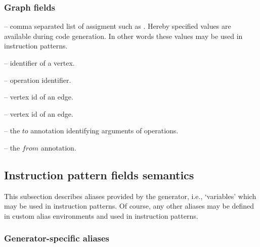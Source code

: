 \subsubsection{Graph fields}
\begin{description}
\item{} -- comma separated list of assigment such as . Hereby specified values are available during code generation. In other words these values may be used in instruction patterns.
\item{} -- identifier of a vertex.
\item{} -- operation identifier.
\item{} -- vertex id of an edge.
\item{} -- vertex id of an edge.
\item{} -- the $to$ annotation identifying arguments of operations.
\item{} -- the $from$ annotation.
\end{description}

\subsection{Instruction pattern fields semantics}

This subsection describes aliases provided by the generator, i.e., `variables' which may be used in instruction patterns. Of course, any other aliases may be defined in custom alias environments and used in instruction patterns.


\subsubsection{Generator-specific aliases}

